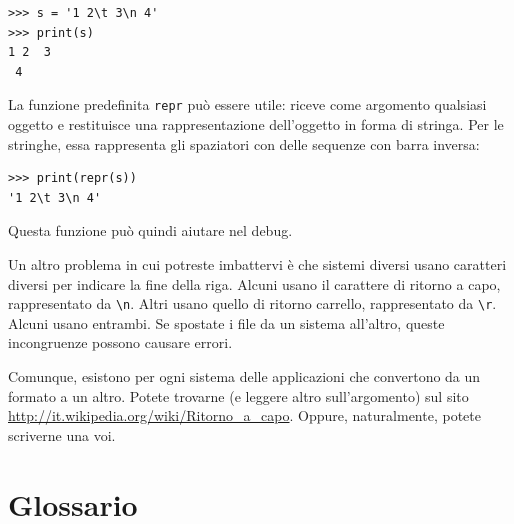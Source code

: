 \documentclass[10pt]{book}
\begin{document}
\begin{verbatim}
>>> s = '1 2\t 3\n 4'
>>> print(s)
1 2	 3
 4
\end{verbatim}

La funzione predefinita {\tt repr} può essere utile: riceve come argomento qualsiasi oggetto e restituisce una rappresentazione dell'oggetto in forma di stringa. Per le stringhe, essa rappresenta gli spaziatori con delle sequenze con barra inversa:

\begin{verbatim}
>>> print(repr(s))
'1 2\t 3\n 4'
\end{verbatim}

Questa funzione può quindi aiutare nel debug.

Un altro problema in cui potreste imbattervi è che sistemi diversi usano caratteri diversi per indicare la fine della riga. Alcuni usano il carattere di ritorno a capo, rappresentato da \verb"\n".  Altri usano quello di ritorno carrello, rappresentato da \verb"\r".  Alcuni usano entrambi. Se spostate i file da un sistema all'altro, queste incongruenze possono causare errori.

Comunque, esistono per ogni sistema delle applicazioni che convertono da un formato a un altro. Potete trovarne (e leggere altro sull'argomento) sul sito \url{http://it.wikipedia.org/wiki/Ritorno_a_capo}.  Oppure, naturalmente, potete scriverne una voi.


\section{Glossario}
\end{document}
